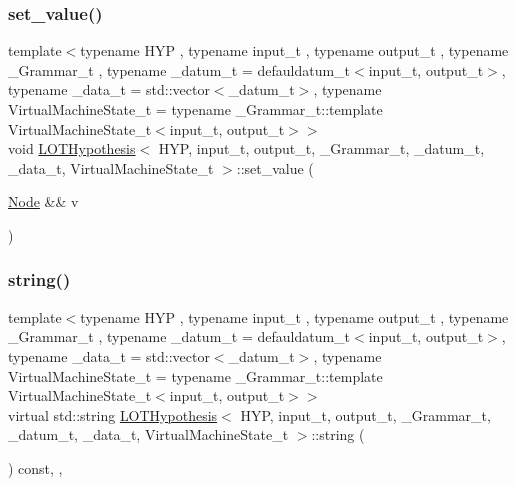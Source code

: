 \subsubsection{\texorpdfstring{set\+\_\+value()}{set\_value()}\hspace{0.1cm}{\footnotesize\ttfamily [2/2]}}
{\footnotesize\ttfamily template$<$typename H\+YP , typename input\+\_\+t , typename output\+\_\+t , typename \+\_\+\+Grammar\+\_\+t , typename \+\_\+datum\+\_\+t  = defauldatum\+\_\+t$<$input\+\_\+t, output\+\_\+t$>$, typename \+\_\+data\+\_\+t  = std\+::vector$<$\+\_\+datum\+\_\+t$>$, typename Virtual\+Machine\+State\+\_\+t  = typename \+\_\+\+Grammar\+\_\+t\+::template Virtual\+Machine\+State\+\_\+t$<$input\+\_\+t, output\+\_\+t$>$$>$ \\
void \hyperlink{class_l_o_t_hypothesis}{L\+O\+T\+Hypothesis}$<$ H\+YP, input\+\_\+t, output\+\_\+t, \+\_\+\+Grammar\+\_\+t, \+\_\+datum\+\_\+t, \+\_\+data\+\_\+t, Virtual\+Machine\+State\+\_\+t $>$\+::set\+\_\+value (\begin{DoxyParamCaption}\item[{\hyperlink{class_node}{Node} \&\&}]{v }\end{DoxyParamCaption})\hspace{0.3cm}{\ttfamily [inline]}}

\mbox{\label{class_l_o_t_hypothesis_acda322aef217a0d358ae6cea19969904}} 
\subsubsection{\texorpdfstring{string()}{string()}}
{\footnotesize\ttfamily template$<$typename H\+YP , typename input\+\_\+t , typename output\+\_\+t , typename \+\_\+\+Grammar\+\_\+t , typename \+\_\+datum\+\_\+t  = defauldatum\+\_\+t$<$input\+\_\+t, output\+\_\+t$>$, typename \+\_\+data\+\_\+t  = std\+::vector$<$\+\_\+datum\+\_\+t$>$, typename Virtual\+Machine\+State\+\_\+t  = typename \+\_\+\+Grammar\+\_\+t\+::template Virtual\+Machine\+State\+\_\+t$<$input\+\_\+t, output\+\_\+t$>$$>$ \\
virtual std\+::string \hyperlink{class_l_o_t_hypothesis}{L\+O\+T\+Hypothesis}$<$ H\+YP, input\+\_\+t, output\+\_\+t, \+\_\+\+Grammar\+\_\+t, \+\_\+datum\+\_\+t, \+\_\+data\+\_\+t, Virtual\+Machine\+State\+\_\+t $>$\+::string (\begin{DoxyParamCaption}{ }\end{DoxyParamCaption}) const\hspace{0.3cm}{\ttfamily [inline]}, {\ttfamily [override]}, {\ttfamily [virtual]}}



